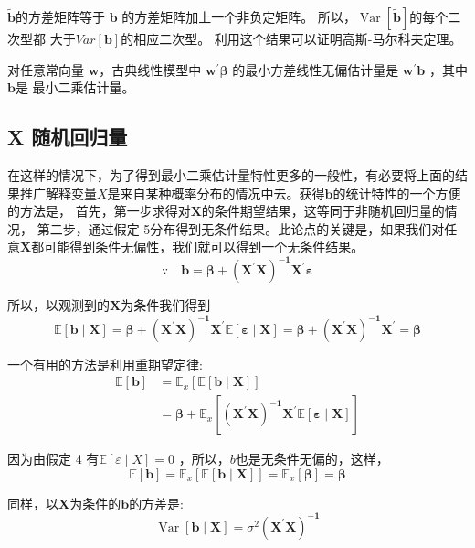      $ \tilde{\boldsymbol{b}} $的方差矩阵等于 $ \boldsymbol{b} $ 的方差矩阵加上一个非负定矩阵。
     所以，$ \operatorname{Var}[\tilde{\boldsymbol{b}}] $的每个二次型都 大于$Var[\boldsymbol{b}]$的相应二次型。
     利用这个结果可以证明{\heiti 高斯-马尔科夫定理}。
     \begin{theorem}[高斯—马尔科夫定理:]
        对任意常向量 $ \boldsymbol{w} $，古典线性模型中 $ \boldsymbol{w^{\prime} \beta}  $
        的最小方差线性无偏估计量是 $ \boldsymbol{w^{\prime} b} $ ，其中$ \boldsymbol{b} $是 最小二乘估计量。
     \end{theorem}
\subsection{ X  随机回归量}

在这样的情况下，为了得到最小二乘估计量特性更多的一般性，有必要将上面的结果推广解释变量$ X $是来自某种概率分布的情况中去。获得$ \boldsymbol{b} $的统计特性的一个方便的方法是，
首先，第一步求得对$ \boldsymbol{X} $的条件期望结果，这等同于非随机回归量的情况，
第二步，通过{\heiti 假定 5}分布得到无条件结果。此论点的关键是，如果我们对任意$ \boldsymbol{X} $都可能得到条件无偏性，我们就可以得到一个无条件结果。
$$ \because  \quad \boldsymbol{b = \beta+\left(X^{\prime} X\right)^{-1} X^{\prime} \varepsilon} $$

所以，以观测到的$ \boldsymbol{X} $为条件我们得到
$$ \mathbb{E}[\boldsymbol{b \mid X} ]  = \boldsymbol{ \beta+\left(X^{\prime} X\right)^{-1} X^{\prime}} \mathbb{E}[\boldsymbol{\varepsilon \mid X}]
        = \boldsymbol{ \beta + \left(X^{\prime} X\right)^{-1} X^{\prime} =\beta }$$

一个有用的方法是利用重期望定律:
$$ \begin{aligned}
    \mathbb{E}[\boldsymbol{b}] & = \mathbb{E}_{x}[\mathbb{E}[\boldsymbol{b \mid X}]] \\
    & = \boldsymbol{\beta}+\mathbb{E}_{x}\left[\boldsymbol{\left(X^{\prime} X\right)^{-1} X^{\prime}} \mathbb{E}[\boldsymbol{\varepsilon \mid X}]\right]
   \end{aligned} $$

因为由{\heiti 假定 4} 有$ \mathbb{E}[\varepsilon \mid X]=0 $ ，所以，$ b $也是无条件无偏的，这样，
$$ \mathbb{E}[\boldsymbol{b}] = \mathbb{E}_{x}[\mathbb{E}[\boldsymbol{b \mid X}]] = \mathbb{E}_{x}[\boldsymbol{\beta}]=\boldsymbol{\beta} $$

同样，以$ \boldsymbol{X} $为条件的$ \boldsymbol{b} $的方差是:
$$ \operatorname{Var}[\boldsymbol{b \mid X}] = \sigma^{2}\boldsymbol{\left(X^{\prime} X\right)^{-1}} $$

